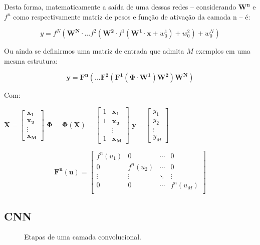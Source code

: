 \documentclass[a0,portrait]{a0poster}
\begin{document}
\begin{multicols}{2}
  Desta forma, matematicamente a saída de uma dessas redes -- considerando $\mathbf{W^n}$ e $f^n$ como respectivamente matriz de pesos e função de ativação da camada n --  é:

  $$
  y = f^N(\mathbf{W^N}\cdot ... f^2(\mathbf{W^2}\cdot f^1(\mathbf{W^1} \cdot \mathbf{x} + w_0^1) + w_0^2) + w_0^N)
  $$

  Ou ainda se definirmos uma matriz de entrada que admita $M$ exemplos em uma mesma estrutura:

\begin{equation}
    \label{eq:mlp}
  \mathbf{y} = \mathbf{F^n}( ... \mathbf{F^2}(\mathbf{F^1}(\boldsymbol{\Phi} \cdot \mathbf{W^1})\mathbf{W^2})\mathbf{W^N})
\end{equation}

  Com:

\hfill
$
\mathbf{X} =\begin{bmatrix}
    \mathbf{x_1} \\
    \mathbf{x_2} \\
    \vdots \\
    \mathbf{x_M}
\end{bmatrix}
$
\hfill
$
\boldsymbol{\Phi} = \boldsymbol{\Phi}(\mathbf{X}) = \begin{bmatrix}
    1 & \mathbf{x_1} \\
    1 & \mathbf{x_2} \\
    &\vdots \\
    1 & \mathbf{x_M}
\end{bmatrix}
$
\hfill
$
\mathbf{y} =\begin{bmatrix}
    y_1 \\
    y_2 \\
    \vdots \\
    y_M
\end{bmatrix}
$
\hfill
\break

$$
\mathbf{{F^n}(u)} = 
\begin{bmatrix}
  f^n(u_1) & 0 & \cdots  & 0 \\
  0 & f^n(u_2) & \cdots  & 0 \\
  \vdots   & \vdots & \ddots & \vdots \\
  0 & 0 & \cdots  & f^n(u_M) \\
\end{bmatrix}
$$
    \subsection*{\LARGE\color{Indigo}CNN}
    
\begin{figure}[H]
    {\centering
    \caption{Etapas de uma camada convolucional.}
    \label{fig:conv}\par}
\end{figure}



\end{multicols}
\end{document}
